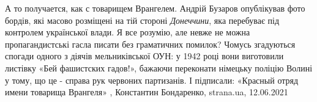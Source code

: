 А то получается, как с товарищем Врангелем.  Андрій Бузаров опублікував фото
бордів, які масово розміщені на тій стороні \emph{Донеччини}, яка перебуває під
контролем української влади. Я все розумію, але невже не можна пропагандистські
гасла писати без граматичних помилок?  Чомусь згадуються спогади одного з
діячів мельниківської ОУН: у 1942 році вони виготовили листівку «Бей фашистских
гадов!», бажаючи переконати німецьку поліцію Волині у тому, що це - справа рук
червоних партизанів. І підписали: «Красный отряд имени товарища Врангеля»
, 
Константин Бондаренко, strana.ua, 12.06.2021

